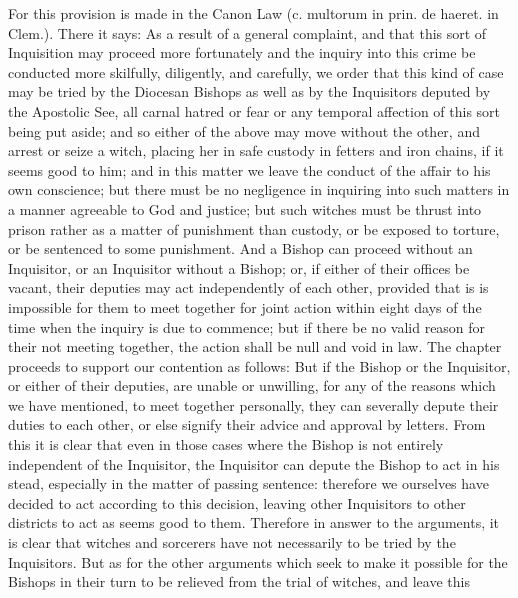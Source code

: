              For this provision is made in the Canon Law (c. multorum in prin. de haeret. in Clem.).
       There it says: As a result of a general complaint, and that this sort of Inquisition may
       proceed more fortunately and the inquiry into this crime be conducted more skilfully,
       diligently, and carefully, we order that this kind of case may be tried by the Diocesan
       Bishops as well as by the Inquisitors deputed by the Apostolic See, all carnal hatred or fear
       or any temporal affection of this sort being put aside; and so either of the above may move
       without the other, and arrest or seize a witch, placing her in safe custody in fetters and iron
       chains, if it seems good to him; and in this matter we leave the conduct of the affair to his
       own conscience; but there must be no negligence in inquiring into such matters in a manner
       agreeable to God and justice; but such witches must be thrust into prison rather as a matter
       of punishment than custody, or be exposed to torture, or be sentenced to some punishment.
       And a Bishop can proceed without an Inquisitor, or an Inquisitor without a Bishop; or, if
       either of their offices be vacant, their deputies may act independently of each other,
       provided that is is impossible for them to meet together for joint action within eight days of
       the time when the inquiry is due to commence; but if there be no valid reason for their not
       meeting together, the action shall be null and void in law.
             The chapter proceeds to support our contention as follows: But if the Bishop or the
       Inquisitor, or either of their deputies, are unable or unwilling, for any of the reasons which
       we have mentioned, to meet together personally, they can severally depute their duties to
       each other, or else signify their advice and approval by letters.
             From this it is clear that even in those cases where the Bishop is not entirely
       independent of the Inquisitor, the Inquisitor can depute the Bishop to act in his stead,
       especially in the matter of passing sentence: therefore we ourselves have decided to act
       according to this decision, leaving other Inquisitors to other districts to act as seems good to
       them.
             Therefore in answer to the arguments, it is clear that witches and sorcerers have not
       necessarily to be tried by the Inquisitors. But as for the other arguments which seek to make
       it possible for the Bishops in their turn to be relieved from the trial of witches, and leave this
